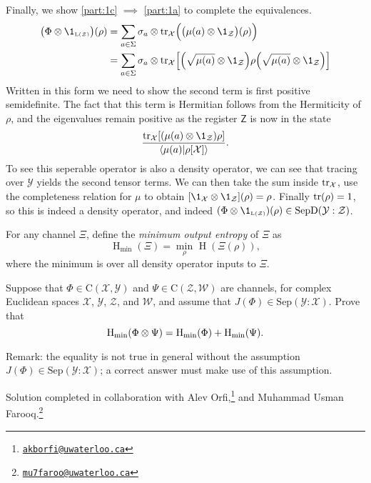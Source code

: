 \documentclass[boxes,pages,color=SeaGreen]{homework}
\newcommand{\collab}[1]{\footnote{\href{mailto:#1}{\texttt{#1}}}}
\newcommand{\tinyspace}{\mspace{1mu}}
\renewcommand{\op}[1]{\operatorname{#1}}
\newcommand{\X}{\mathcal{X}}
\newcommand{\Y}{\mathcal{Y}}
\newcommand{\Z}{\mathcal{Z}}
\newcommand{\W}{\mathcal{W}}
\newcommand{\Lin}{\mathrm{L}}
\newcommand{\Channel}{\mathrm{C}}
\newcommand{\Sep}{\mathrm{Sep}}
\newcommand{\SepD}{\mathrm{SepD}}
\begin{document}
\begin{solution}
  Finally, we show \ref{part:1c} $\implies$ \ref{part:1a} to complete the equivalences.
  \begin{align*}
    \qty\big(\Phi\otimes\1_\mathsmaller{\Lin(\Z)})(\rho) & = \sum_{a\in\Sigma}\sigma_a\otimes \tr_\X\!\qty\Big(\qty\big(\mu(a)\otimes\1_\Z)(\rho))                               \\
                                                         & = \sum_{a\in\Sigma}\sigma_a\otimes \tr_\X\!\qty[\qty(\sqrt{\mu(a)}\otimes\1_\Z) \rho \qty(\sqrt{\mu(a)}\otimes\1_\Z)]
  \end{align*}
  Written in this form we need to show the second term is first positive semidefinite.
  The fact that this term is Hermitian follows from the Hermiticity of $\rho$, and the eigenvalues remain positive as the register $\mathsf{Z}$ is now in the state
  \begin{equation*}
    \frac{\tr_\X\!\qty[\qty(\mu(a)\otimes\1_\Z)\rho]}{\ip{\mu(a)}{\rho[\X]}}.
  \end{equation*}
  To see this seperable operator is also a density operator, we can see that tracing over $\Y$ yields the second tensor terms.
  We can then take the sum inside $\tr_\X$, use the completeness relation for $\mu$ to obtain $[\1_\X\otimes\1_\Z](\rho) = \rho$.
  Finally $\tr(\rho) = 1$, so this is indeed a density operator, and indeed $(\Phi\otimes\1_\mathsmaller{\Lin(\Z)})(\rho)\in\SepD(\Y:\Z)$.
\end{solution}

\begin{problem}
For any channel $\Xi$, define the \emph{minimum output entropy} of $\Xi$ as
\[
  \op{H}_{\text{min}}(\Xi) = \min_{\rho} \tinyspace \op{H}(\Xi(\rho)),
\]
where the minimum is over all density operator inputs to $\Xi$.

Suppose that $\Phi\in\Channel(\X, \Y)$ and $\Psi\in\Channel(\Z, \W)$ are
channels, for complex Euclidean spaces $\X$, $\Y$, $\Z$, and $\W$, and assume
that $J(\Phi)\in\Sep(\Y \mathbin{:} \X)$.
Prove that
\[
  \op{H}_{\text{min}}(\Phi\otimes\Psi) =
  \op{H}_{\text{min}}(\Phi) + \op{H}_{\textup{min}}(\Psi).
\]

Remark: the equality is not true in general without the assumption
$J(\Phi)\in\Sep(\Y \mathbin{:} \X)$; a correct answer must make use of this
assumption.
\end{problem}

\noindent Solution completed in collaboration with Alev Orfi,\collab{akborfi@uwaterloo.ca} and Muhammad Usman Farooq.\collab{mu7faroo@uwaterloo.ca}
\end{document}
